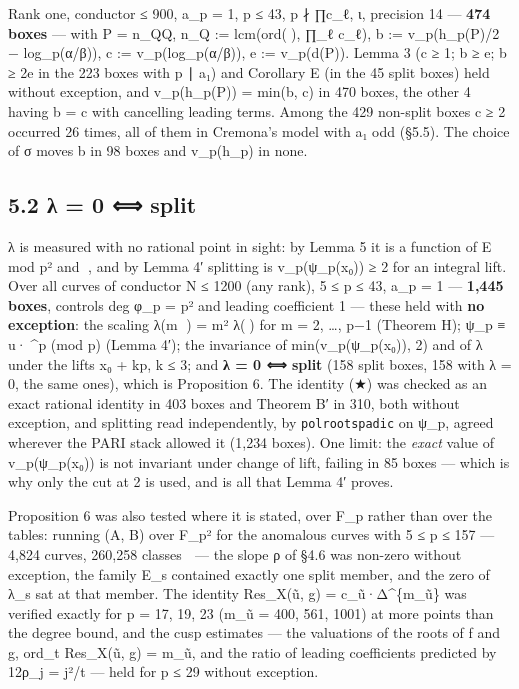 \documentclass[11pt,a4paper]{article}
\theoremstyle{named}
\begin{document}
Rank one, conductor ≤ 900, a\_p = 1, p ≤ 43, p ∤ ∏c\_ℓ, ι, precision 14 — \textbf{474 boxes} — with P = n\_QQ, n\_Q := lcm(ord(), ∏\_ℓ c\_ℓ), b := v\_p(h\_p(P)/2 − log\_p(α/β)), c := v\_p(log\_p(α/β)), e := v\_p(d(P)). Lemma 3 (c ≥ 1; b ≥ e; b ≥ 2e in the 223 boxes with p ∣ a₁) and Corollary E (in the 45 split boxes) held without exception, and v\_p(h\_p(P)) = min(b, c) in 470 boxes, the other 4 having b = c with cancelling leading terms. Among the 429 non-split boxes c ≥ 2 occurred 26 times, all of them in Cremona's model with a₁ odd (§5.5). The choice of σ moves b in 98 boxes and v\_p(h\_p) in none.

\subsection*{5.2 λ = 0 ⟺ split}

λ is measured with no rational point in sight: by Lemma 5 it is a function of E mod p² and , and by Lemma 4′ splitting is v\_p(ψ\_p(x₀)) ≥ 2 for an integral lift. Over all curves of conductor N ≤ 1200 (any rank), 5 ≤ p ≤ 43, a\_p = 1 — \textbf{1,445 boxes}, controls deg φ\_p = p² and leading coefficient 1 — these held with \textbf{no exception}: the scaling λ(m ) = m² λ() for m = 2, …, p−1 (Theorem H); ψ\_p ≡ u·\textasciicircum{}p (mod p) (Lemma 4′); the invariance of min(v\_p(ψ\_p(x₀)), 2) and of λ under the lifts x₀ + kp, k ≤ 3; and \textbf{λ = 0 ⟺ split} (158 split boxes, 158 with λ = 0, the same ones), which is Proposition 6. The identity (★) was checked as an exact rational identity in 403 boxes and Theorem B′ in 310, both without exception, and splitting read independently, by \texttt{polrootspadic} on ψ\_p, agreed wherever the PARI stack allowed it (1,234 boxes). One limit: the \textit{exact} value of v\_p(ψ\_p(x₀)) is not invariant under change of lift, failing in 85 boxes — which is why only the cut at 2 is used, and is all that Lemma 4′ proves.

Proposition 6 was also tested where it is stated, over F\_p rather than over the tables: running (A, B) over F\_p² for the anomalous curves with 5 ≤ p ≤ 157 — 4,824 curves, 260,258 classes  — the slope ρ of §4.6 was non-zero without exception, the family E\_s contained exactly one split member, and the zero of λ\_s sat at that member. The identity Res\_X(ũ, g) = c\_ũ·Δ\textasciicircum{}\{m\_ũ\} was verified exactly for p = 17, 19, 23 (m\_ũ = 400, 561, 1001) at more points than the degree bound, and the cusp estimates — the valuations of the roots of f and g, ord\_t Res\_X(ũ, g) = m\_ũ, and the ratio of leading coefficients predicted by 12ρ\_j = j²/t — held for p ≤ 29 without exception.
\end{document}
